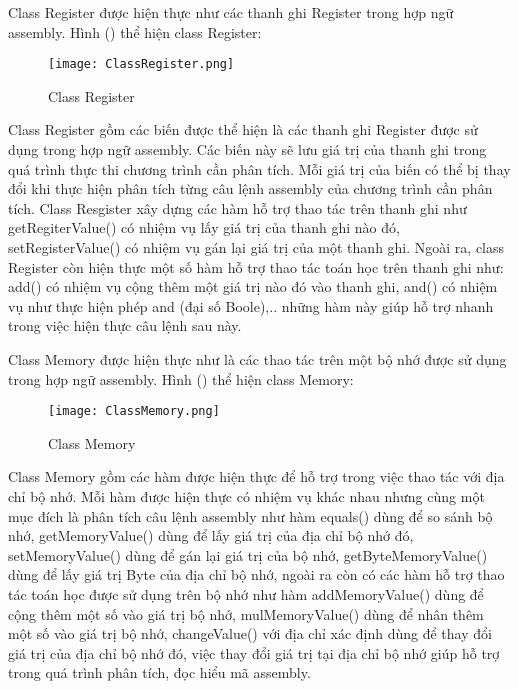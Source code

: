 		\newpage
		Class Register được hiện thực như các thanh ghi Register trong hợp ngữ assembly. Hình () thể hiện class Register:
		\begin{center}
			\begin{figure}[htp]
				\begin{center}
					\texttt{[image: ClassRegister.png]}
				\end{center}
				\caption{Class Register}	
					\label{fig:ClassRegister}		
			\end{figure}
		\end{center}		
			
	Class Register gồm các biến được thể hiện là các thanh ghi Register được sử dụng trong hợp ngữ assembly. Các biến này sẽ lưu giá trị của thanh ghi trong quá trình thực thi chương trình cần phân tích. Mỗi giá trị của biến có thể bị thay đổi khi thực hiện phân tích từng câu lệnh assembly của chương trình cần phân tích. Class Resgister xây dựng các hàm hỗ trợ thao tác trên thanh ghi như getRegiterValue() có nhiệm vụ lấy giá trị của thanh ghi nào đó, setRegisterValue() có nhiệm vụ gán lại giá trị của một thanh ghi. Ngoài ra, class Register còn hiện thực một số hàm hỗ trợ thao tác toán học trên thanh ghi như: add() có nhiệm vụ cộng thêm một giá trị nào đó vào thanh ghi, and() có nhiệm vụ như thực hiện phép and (đại số Boole),.. những hàm này giúp hỗ trợ nhanh trong việc hiện thực câu lệnh sau này.
	
		\newpage
	Class Memory được hiện thực như là các thao tác trên một bộ nhớ được sử dụng trong hợp ngữ assembly. Hình () thể hiện class Memory: 
	
		\begin{center}
			\begin{figure}[htp]
				\begin{center}
					\texttt{[image: ClassMemory.png]}
				\end{center}
				\caption{Class Memory}	
					\label{fig:ClassMemory}		
			\end{figure}
		\end{center}		
	
	Class Memory gồm các hàm được hiện thực để hỗ trợ trong việc thao tác với địa chỉ bộ nhớ. Mỗi hàm được hiện thực có nhiệm vụ khác nhau nhưng cùng một mục đích là phân tích câu lệnh assembly như hàm equals() dùng để so sánh bộ nhớ, getMemoryValue() dùng để lấy giá trị của địa chỉ bộ nhớ đó, setMemoryValue() dùng để gán lại giá trị của bộ nhớ, getByteMemoryValue() dùng để lấy giá trị Byte của địa chỉ bộ nhớ, ngoài ra còn có các hàm hỗ trợ thao tác toán học được sử dụng trên bộ nhớ như hàm addMemoryValue() dùng để cộng thêm một số vào giá trị bộ nhớ, mulMemoryValue() dùng để nhân thêm một số vào giá trị bộ nhớ, changeValue() với địa chỉ xác định dùng để thay đổi giá trị của địa chỉ bộ nhớ đó, việc thay đổi giá trị tại địa chỉ bộ nhớ giúp hỗ trợ trong quá trình phân tích, đọc hiểu mã assembly.
	
